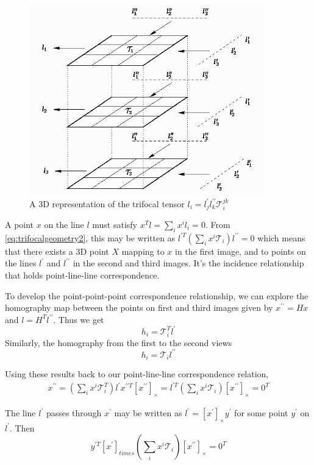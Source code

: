 \begin{figure}[ht!]
  \centering
  \includegraphics[width=100mm]{figures/trifocaltensor.png}
  \caption{A 3D representation of the trifocal tensor $l_{i} = l_{j}^{\prime} l_{k}^{\prime \prime} \mathcal{T}_{i}^{jk}$ }
  \label{fig:trifocaltensor}
\end{figure}

A point $x$ on the line $l$ must satisfy $x^{T}l = \sum_{i} x^{i}l_{i} = 0$. From \eqref{eq:trifocalgeometry2}, this may be written as
$
l^{\prime T}(\sum_{i} x^{i}\mathcal{T}_{i}) l^{\prime \prime} = 0
$
which means that there exists a 3D point $X$ mapping to $x$ in the first image, and to points on the lines $l^{\prime}$ and $l^{\prime \prime}$ in the second and third images. It's the incidence relationship that holds point-line-line correspondence.

To develop the point-point-point correspondence relationship, we can explore the homography map between the points on first and third images given by $x^{\prime \prime} = Hx$ and $l = H^{T}l^{\prime \prime}$. Thus we get
$$
  h_i = \mathcal{T}^{T}_{i}l^{\prime}
$$
Similarly, the homography from the first to the second views
$$
  h_i = \mathcal{T}_{i}l^{\prime \prime}
$$

Using these results back to our point-line-line correspondence relation,
\begin{gather*}
  x^{\prime \prime} = (\sum_{i} x^{i}\mathcal{T}^{T}_{i}) l^{\prime}
  x^{\prime \prime T}[x^{\prime \prime}]_{\times} = l^{\prime T} (\sum_{i} x^{i}\mathcal{T}_{i})[x^{\prime \prime}]_{\times} = 0^{T}
\end{gather*}

The line $l^{\prime}$ passes through $x^{\prime}$ may be written as $l^{\prime} = [x^{\prime}]_{\times}y^{\prime}$ for some point $y^{\prime}$ on $l^{\prime}$. Then
$$
  y^{\prime T} [x^{\prime}]_{times} (\sum_{i} x^{i}\mathcal{T}_{i})[x^{\prime \prime}]_{\times} = 0^{T}
$$

